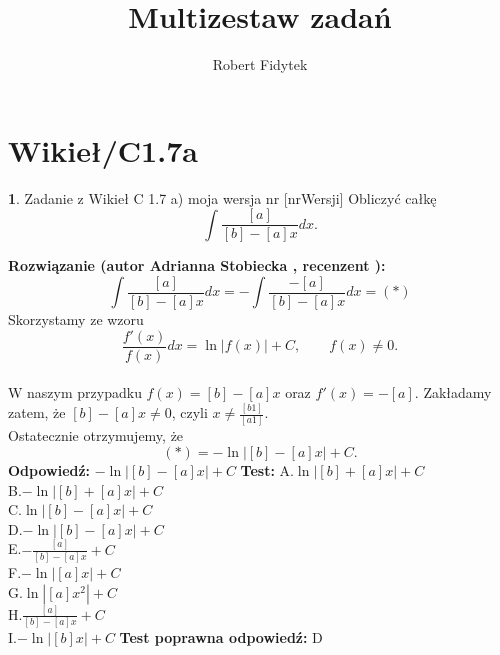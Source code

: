 \documentclass[12pt, a4paper]{article}
\title{Multizestaw zadań}
\author{Robert Fidytek}
\date{}
\theoremstyle{definition} %
\newtheorem{zad}{}
\newcommand{\kategoria}[1]{\section{#1}} %
\newcommand{\zadStart}[1]{\begin{zad}#1\newline} %
\newcommand{\zadStop}{\end{zad}}   %
\newcommand{\rozwStart}[2]{\noindent \textbf{Rozwiązanie (autor #1 , recenzent #2): }\newline} %
\newcommand{\rozwStop}{\newline}                                            %
\newcommand{\odpStart}{\noindent \textbf{Odpowiedź:}\newline}    %
\newcommand{\odpStop}{\newline}                                             %
\newcommand{\testStart}{\noindent \textbf{Test:}\newline} %
\newcommand{\testStop}{\newline} %
\newcommand{\kluczStart}{\noindent \textbf{Test poprawna odpowiedź:}\newline} %
\newcommand{\kluczStop}{\newline} %
\begin{document}
\maketitle


\kategoria{Wikieł/C1.7a}
\zadStart{Zadanie z Wikieł C 1.7 a) moja wersja nr [nrWersji]}
Obliczyć całkę
$$\int\frac{[a]}{[b]-[a]x}dx.$$
\zadStop
\rozwStart{Adrianna Stobiecka}{}
$$\int\frac{[a]}{[b]-[a]x}dx=-\int\frac{-[a]}{[b]-[a]x}dx=(*)$$
Skorzystamy ze wzoru $$\frac{f'(x)}{f(x)}dx=\ln{|f(x)|}+C, \qquad f(x)\ne0.$$
\\W naszym przypadku $f(x)=[b]-[a]x$ oraz $f'(x)=-[a]$. Zakładamy zatem, że $[b]-[a]x\ne0$, czyli $x\ne\frac{[b1]}{[a1]}$.
\\Ostatecznie otrzymujemy, że 
$$(*)=-\ln{|[b]-[a]x|}+C.$$
\rozwStop
\odpStart
$-\ln{|[b]-[a]x|}+C$
\odpStop
\testStart
A.$\ln{|[b]+[a]x|}+C$\\
B.$-\ln{|[b]+[a]x|}+C$\\
C.$\ln{|[b]-[a]x|}+C$\\
D.$-\ln{|[b]-[a]x|}+C$\\
E.$-\frac{[a]}{[b]-[a]x}+C$\\
F.$-\ln{|[a]x|}+C$\\
G.$\ln{|[a]x^2|}+C$\\
H.$\frac{[a]}{[b]-[a]x}+C$\\
I.$-\ln{|[b]x|}+C$
\testStop
\kluczStart
D
\kluczStop
\end{document}
